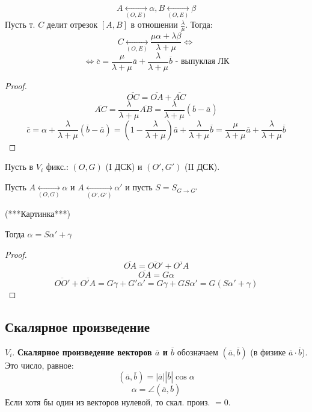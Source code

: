 \begin{statement}
    \[
    A \underset{(O, E)}{\longleftrightarrow}\alpha, B \underset{(O, E)}{\longleftrightarrow} \beta
    \] 
    Пусть т. $C$ делит отрезок $[A, B]$ в отношении $\frac{\lambda}{\mu}$. Тогда:
    \[
        C \underset{(O, E)}{\longleftrightarrow} \frac{\mu\alpha + \lambda \beta}{\lambda + \mu} \iff
    \] 
    \[
        \iff \overline{c} = \frac{\mu}{\lambda + \mu} \overline{a} + \frac{\lambda}{\lambda + \mu} \overline{b} \text{ - выпуклая ЛК}
    \] 

\end{statement}
\begin{proof}
    \[
    \overline{OC} = \overline{OA} + \overline{AC}
    \] 
    \[
    \overline{AC} = \frac{\lambda}{\lambda + \mu} \overline{AB} = \frac{\lambda}{\lambda + \mu}(\overline{b} - \overline{a})
    \] 
    \[
    \overline{c} = \alpha + \frac{\lambda}{\lambda + \mu} (\overline{b} - \overline{a}) = (1 - \frac{\lambda}{\lambda + \mu}) \overline{a} + \frac{\lambda}{\lambda + \mu} \overline{b} = \frac{\mu}{\lambda + \mu} \overline{a} + \frac{\lambda}{\lambda + \mu} \overline{b}
    \] 
\end{proof}
\begin{theorem} 
Пусть в $V_i$ фикс.: $(O, G)$ (I ДСК) и $(O', G')$ (II ДСК).

Пусть $A \underset{(O, G)}{\longleftrightarrow} \alpha$ и $A \underset{(O', G')}{\longleftrightarrow} \alpha'$ и пусть $S = S_{G \to G'}$

(***Картинка***)

Тогда $\alpha = S\alpha' + \gamma$
\end{theorem}
\begin{proof}
\[
\overline{OA} = \overline{OO'} + \overline{O'A}
\] 
\[
\overline{OA} = G \alpha
\] 
\[
\overline{OO'} + \overline{O'A} = G \gamma + G' \alpha' = G \gamma + GS \alpha' = G(S\alpha' + \gamma)
\] 
\end{proof}
\subsection{Скалярное произведение}

\begin{definition}
$V_i$. \textbf{Скалярное произведение векторов $\overline{a}$ и $\overline{b}$} обозначаем $(\overline{a}, \overline{b})$ (в физике $\overline{a} \cdot \overline{b}$). Это число, равное:
\[
    (\overline{a}, \overline{b}) = |\overline{a}||\overline{b}|\cos \alpha
\] 
\[
\alpha = \angle (\overline{a}, \overline{b})
\] 
Если хотя бы один из векторов нулевой, то скал. произ. $ = 0$.
\end{definition}

